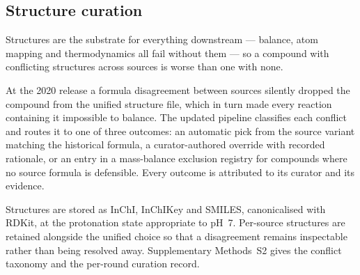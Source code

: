 \subsection{Structure curation}\label{sec:structure-curation}

Structures are the substrate for everything downstream --- balance, atom
mapping and thermodynamics all fail without them --- so a compound with
conflicting structures across sources is worse than one with none.

At the 2020 release a formula disagreement between sources silently dropped the
compound from the unified structure file, which in turn made every reaction
containing it impossible to balance. The updated pipeline classifies each
conflict and routes it to one of three outcomes: an automatic pick from the
source variant matching the historical formula, a curator-authored override
with recorded rationale, or an entry in a mass-balance exclusion registry for
compounds where no source formula is defensible. Every outcome is attributed to
its curator and its evidence.

Structures are stored as InChI, InChIKey and SMILES, canonicalised with RDKit,
at the protonation state appropriate to pH~7. Per-source structures are
retained alongside the unified choice so that a disagreement remains
inspectable rather than being resolved away. Supplementary Methods~S2 gives the
conflict taxonomy and the per-round curation record.
